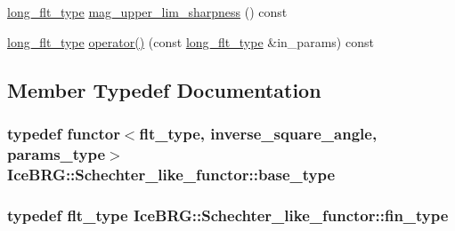 \begin{DoxyCompactItemize}
\item 
\hyperlink{lib_2IceBRG__main_2common_8h_a7040956e7e1b504d34a9ccfb4253bdce}{long\+\_\+flt\+\_\+type} \hyperlink{classIceBRG_1_1Schechter__like__functor_a9067e3ec4ebd3df8ee873f729334e7ad}{mag\+\_\+upper\+\_\+lim\+\_\+sharpness} () const 
\item 
\hyperlink{lib_2IceBRG__main_2common_8h_a7040956e7e1b504d34a9ccfb4253bdce}{long\+\_\+flt\+\_\+type} \hyperlink{classIceBRG_1_1Schechter__like__functor_a969b8cbbbb6cc12cf666d3a1e3a3dd74}{operator()} (const \hyperlink{lib_2IceBRG__main_2common_8h_a7040956e7e1b504d34a9ccfb4253bdce}{long\+\_\+flt\+\_\+type} \&in\+\_\+params) const 
\end{DoxyCompactItemize}


\subsection{Member Typedef Documentation}
\hypertarget{classIceBRG_1_1Schechter__like__functor_a919adc2367dc8f3b9939f3ae87d14315}{}
\subsubsection[{base\+\_\+type}]{\setlength{\rightskip}{0pt plus 5cm}typedef {\bf functor}$<${\bf flt\+\_\+type}, {\bf inverse\+\_\+square\+\_\+angle}, {\bf params\+\_\+type}$>$ {\bf Ice\+B\+R\+G\+::\+Schechter\+\_\+like\+\_\+functor\+::base\+\_\+type}}\label{classIceBRG_1_1Schechter__like__functor_a919adc2367dc8f3b9939f3ae87d14315}
\hypertarget{classIceBRG_1_1Schechter__like__functor_aa444797b63bb4d4b01859b9c6a5d528e}{}
\subsubsection[{fin\+\_\+type}]{\setlength{\rightskip}{0pt plus 5cm}typedef {\bf flt\+\_\+type} {\bf Ice\+B\+R\+G\+::\+Schechter\+\_\+like\+\_\+functor\+::fin\+\_\+type}}\label{classIceBRG_1_1Schechter__like__functor_aa444797b63bb4d4b01859b9c6a5d528e}
\hypertarget{classIceBRG_1_1Schechter__like__functor_a90c760c2efcd3ae2b3a7f733672b18ed}{}
